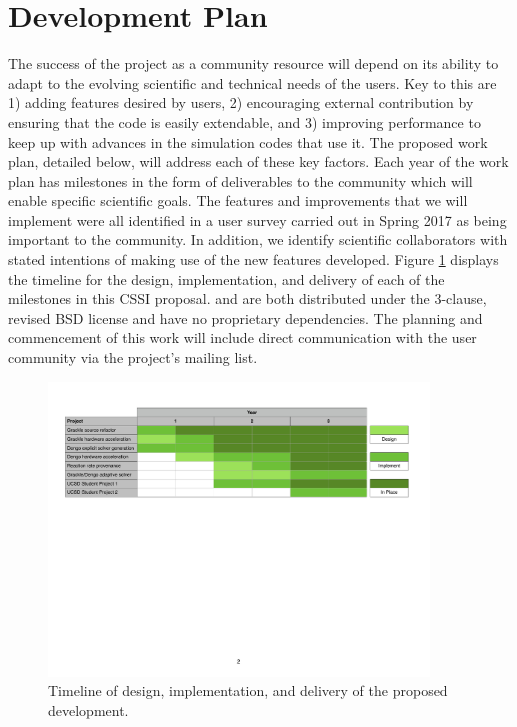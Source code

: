 \section{Development Plan}

The success of the \grackle{} project as a community resource will
depend on its ability to adapt to the evolving scientific and
technical needs of the users. Key to this are 1) adding features
desired by users, 2) encouraging external contribution by ensuring
that the code is easily extendable, and 3) improving performance to
keep up with advances in the simulation codes that use it.
The proposed work plan, detailed below, will address each of these key
factors. Each year of the work plan has milestones in the form of
deliverables to the community which will enable specific scientific
goals. The features and improvements that we will implement were all
identified in a \grackle{} user survey carried out in Spring 2017 as
being important to the community. In addition, we identify scientific
collaborators with stated intentions of making use of the new features
developed. Figure \ref{fig:gantt} displays the timeline for the
design, implementation, and delivery of each of the milestones in this
CSSI proposal. \grackle{} and \dengo{} are both distributed under the
3-clause, revised BSD license and have no proprietary
dependencies. The planning and commencement of this work will include
direct communication with the \grackle{} user community via the
project's mailing list.

\begin{figure}
\begin{center}
\includegraphics[width=0.9\textwidth]{figures/gantt.pdf}
\caption{Timeline of design, implementation, and delivery of the
  proposed development.}
\label{fig:gantt}
\end{center}
\vspace*{-2\baselineskip}
\end{figure}

